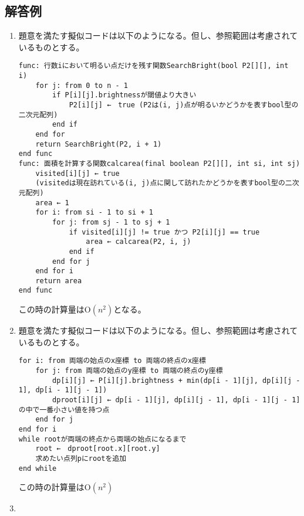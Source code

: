 \newpage

\subsection{解答例}
\begin{enumerate}[(1)]
    \item 題意を満たす擬似コードは以下のようになる。但し、参照範囲は考慮されているものとする。
\begin{lstlisting}[frame = sigle, style = customText]
func: 行数iにおいて明るい点だけを残す関数SearchBright(bool P2[][], int i)
    for j: from 0 to n - 1
        if P[i][j].brightnessが閾値より大きい
            P2[i][j] ←　true (P2は(i, j)点が明るいかどうかを表すbool型の二次元配列)
        end if
    end for
    return SearchBright(P2, i + 1)
end func
func: 面積を計算する関数calcarea(final boolean P2[][], int si, int sj) 
    visited[i][j] ← true 
    (visitedは現在訪れている(i, j)点に関して訪れたかどうかを表すbool型の二次元配列)
    area ← 1
    for i: from si - 1 to si + 1
        for j: from sj - 1 to sj + 1
            if visited[i][j] != true かつ P2[i][j] == true
                area ← calcarea(P2, i, j)
            end if
        end for j
    end for i
    return area
end func
\end{lstlisting}
    この時の計算量は$\mathrm{O}(n^2)$となる。
    \item 題意を満たす擬似コードは以下のようになる。但し、参照範囲は考慮されているものとする。
\begin{lstlisting}[frame = single, style = customText]
for i: from 両端の始点のx座標 to 両端の終点のx座標
    for j: from 両端の始点のy座標 to 両端の終点のy座標
        dp[i][j] ← P[i][j].brightness + min(dp[i - 1][j], dp[i][j - 1], dp[i - 1][j - 1])
        dproot[i][j] ← dp[i - 1][j], dp[i][j - 1], dp[i - 1][j - 1]の中で一番小さい値を持つ点
    end for j
end for i
while rootが両端の終点から両端の始点になるまで
    root ←　dproot[root.x][root.y]
    求めたい点列pにrootを追加
end while
\end{lstlisting}
    この時の計算量は$\mathrm{O}(n^2)$
    \item 
\end{enumerate}